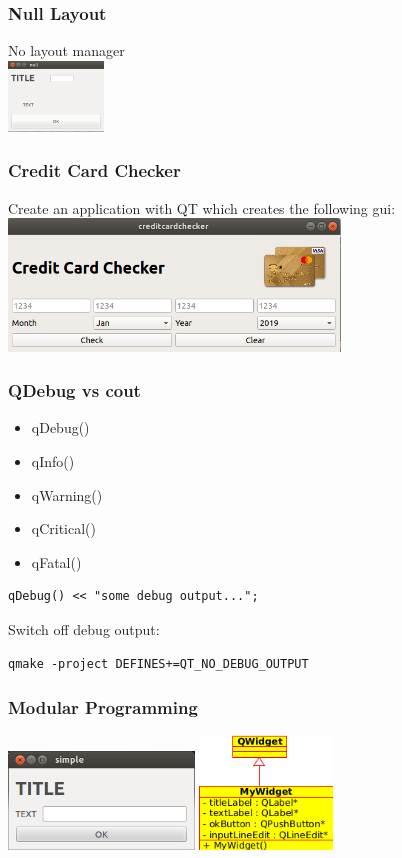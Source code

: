 \frame
{
\frametitle{Null Layout}
No layout manager\\
\includegraphics[width=72pt]{code/qt/null/xylayout.png}\\
{\tiny

}
}

\begin{frame}[fragile]
\frametitle{Credit Card Checker}
\begin{exercise}
Create an application with QT which creates the following gui:
\includegraphics[width=250pt]{img/creditcard_gui.png}
\end{exercise}
\end{frame}


\begin{frame}[fragile]
\frametitle{QDebug vs cout}
\begin{itemize}
\item qDebug()
\item qInfo()
\item qWarning()
\item qCritical()
\item qFatal()
\end{itemize}

\begin{lstlisting}
qDebug() << "some debug output...";
\end{lstlisting}

Switch off debug output:
\begin{lstlisting}
qmake -project DEFINES+=QT_NO_DEBUG_OUTPUT
\end{lstlisting}

\end{frame}


\begin{frame}[fragile]
\frametitle{Modular Programming}
\includegraphics[width=140pt]{img/simple.png}
\hspace{4mm}
\includegraphics[width=100pt]{img/simplecd.png}
\end{frame}

